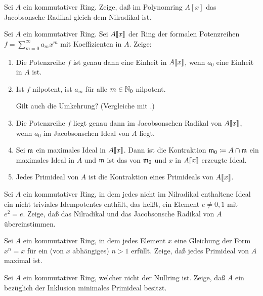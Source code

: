 \begin{exercise}
	Sei \(A\) ein kommutativer Ring. Zeige, daß im Polynomring \(A[x]\) das 
	Jacobsonsche Radikal gleich dem Nilradikal ist.
\end{exercise}

\begin{exercise}
	Sei \(A\) ein kommutativer Ring. Sei \(A\llbracket x\rrbracket\) der Ring der formalen
	Potenzreihen \(f = \sum\limits_{m = 0}^\infty a_m x^m\) mit Koeffizienten in
	\(A\). Zeige:
	\begin{enumerate}
	\item
		Die Potenzreihe \(f\) ist genau dann eine Einheit in \(A\llbracket x\rrbracket\), wenn
		\(a_0\) eine Einheit in \(A\) ist.
	\item
		Ist \(f\) nilpotent, ist \(a_m\) für alle \(m \in \mathbb N_0\) nilpotent.
		
		Gilt auch die Umkehrung? (Vergleiche mit .)
	\item
		Die Potenzreihe \(f\) liegt genau dann im Jacobsonschen Radikal von
		\(A\llbracket x\rrbracket\), wenn \(a_0\) im Jacobsonschen Ideal von \(A\) liegt.
	\item
		Sei \(\mathfrak{m}\) ein maximales Ideal in \(A\llbracket x\rrbracket\). Dann ist
		die Kontraktion \(\mathfrak{m}_0 \coloneqq A \cap \mathfrak{m}\) ein maximales Ideal
		in \(A\) und \(\mathfrak{m}\) ist das von \(\mathfrak{m}_0\) und \(x\) in \(A\llbracket x\rrbracket\)
		erzeugte Ideal.
	\item
		Jedes Primideal von \(A\) ist die Kontraktion eines Primideals von
		\(A\llbracket x\rrbracket\).
	\end{enumerate}
\end{exercise}

\begin{exercise}
	Sei \(A\) ein kommutativer Ring, in dem jedes nicht im Nilradikal enthaltene
	Ideal ein nicht triviales Idempotentes enthält, das heißt, ein Element
	\(e \neq 0,1\) mit \(e^2 = e\). Zeige, daß das Nilradikal und das Jacobsonsche
	Radikal von \(A\) übereinstimmen.
\end{exercise}

\begin{exercise}
	Sei \(A\) ein kommutativer Ring, in dem jedes Element \(x\) eine Gleichung der
	Form \(x^n = x\) für ein (von \(x\) abhängiges) \(n > 1\) erfüllt. Zeige, daß
	jedes Primideal von \(A\) maximal ist.
\end{exercise}

\begin{exercise}
	Sei \(A\) ein kommutativer Ring, welcher nicht der Nullring ist. Zeige, daß \(A\)
	ein bezüglich der Inklusion minimales Primideal besitzt.
\end{exercise}

